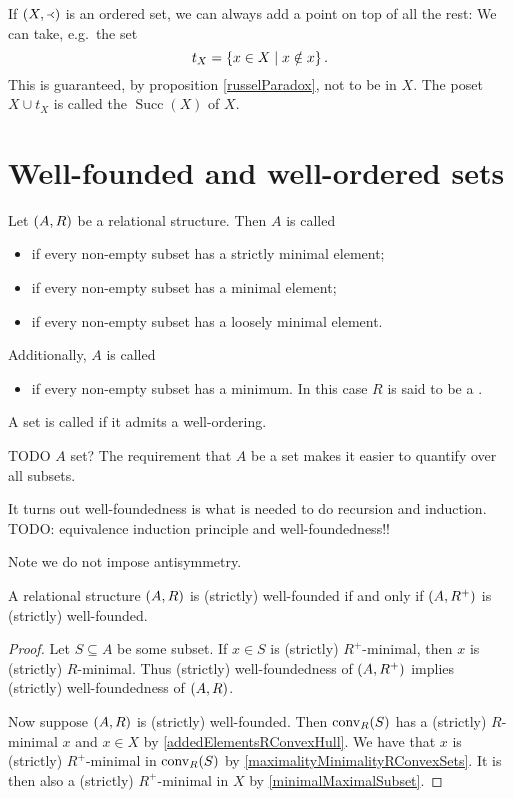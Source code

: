 If $\left( X,\Yleft \right)$ is an ordered set, we can always add a point on top of all the rest: We can take, e.g.\ the set
\[ t_X = \left\{ x\in X \;\middle|\; x\notin x \right\}. \]
This is guaranteed, by proposition \ref{russelParadox}, not to be in $X$.
The poset $X\cup t_X$ is called the  $\operatorname{Succ}(X)$ of $X$.



\section{Well-founded and well-ordered sets}
\begin{definition}
Let $\left( A,R \right)$ be a relational structure.
Then $A$ is called
\begin{itemize}
\item {} if every non-empty subset has a strictly minimal element;
\item {} if every non-empty subset has a minimal element;
\item {} if every non-empty subset has a loosely minimal element.
\end{itemize}
Additionally, $A$ is called
\begin{itemize}
\item {} if every non-empty subset has a minimum. In this case $R$ is said to be a .
\end{itemize}
A set is called  if it admits a well-ordering.
\end{definition}
TODO $A$ set? The requirement that $A$ be a set makes it easier to quantify over all subsets.

It turns out well-foundedness is what is needed to do recursion and induction. TODO: equivalence induction principle and well-foundedness!!

Note we do not impose antisymmetry.

\begin{proposition}
A relational structure $\left( A,R \right)$ is (strictly) well-founded \textup{if and only if} $\left( A,R^+ \right)$ is (strictly) well-founded.
\end{proposition}
\begin{proof}
Let $S \subseteq A$ be some subset. If $x\in S$ is (strictly) $R^+$-minimal, then $x$ is (strictly) $R$-minimal. Thus (strictly) well-foundedness of $\left( A,R^+ \right)$ implies (strictly) well-foundedness of $\left( A,R \right)$.

Now suppose $\left( A,R \right)$ is (strictly) well-founded. Then $\operatorname{conv}_R(S)$ has a (strictly) $R$-minimal $x$ and $x\in X$ by \ref{addedElementsRConvexHull}. We have that $x$ is (strictly) $R^+$-minimal in $\operatorname{conv}_R(S)$ by \ref{maximalityMinimalityRConvexSets}. It is then also a (strictly) $R^+$-minimal in $X$ by \ref{minimalMaximalSubset}.
\end{proof}

